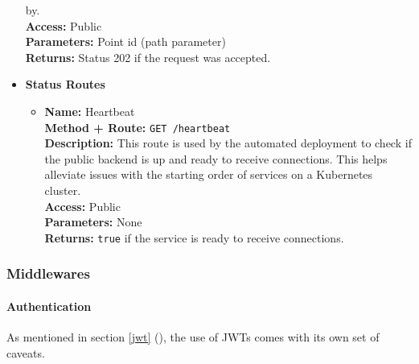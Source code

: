 \begin{itemize}
{\begin{itemize}
{        by.\\
        \textbf{Access:} Public\\
        \textbf{Parameters:} Point id (path parameter)\\
        \textbf{Returns:} Status 202 if the request was accepted.\\
      }
    \end{itemize}
  }
  \item{
    \textbf{Status Routes}
    \begin{itemize}
      \item {
        \textbf{Name:} Heartbeat\\
        \textbf{Method + Route:} \texttt{GET /heartbeat}\\
        \textbf{Description:} This route is used by the automated deployment to
        check if the public backend is up and ready to receive connections. This
        helps alleviate issues with the starting order of services on a
        Kubernetes cluster.\\
        \textbf{Access:} Public\\
        \textbf{Parameters:} None\\
        \textbf{Returns:} \texttt{true} if the service is ready to receive connections.\\
      }
    \end{itemize}
  }
\end{itemize}


\subsubsection{Middlewares}
\paragraph{Authentication}


As mentioned in section \ref{jwt} (), the use of JWTs comes with
its own set of caveats.

